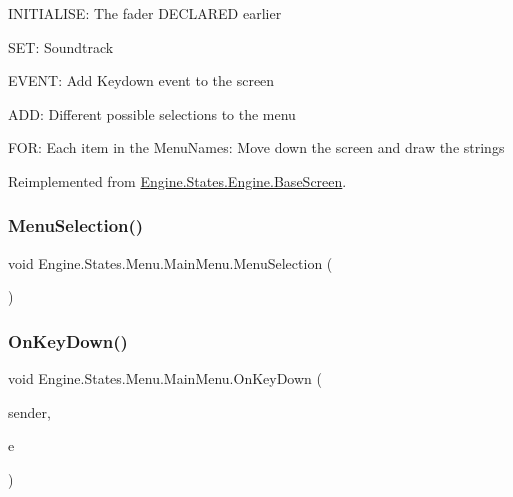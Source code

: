 I\+N\+I\+T\+I\+A\+L\+I\+SE\+: The fader D\+E\+C\+L\+A\+R\+ED earlier

S\+ET\+: Soundtrack

E\+V\+E\+NT\+: Add Keydown event to the screen

A\+DD\+: Different possible selections to the menu

F\+OR\+: Each item in the Menu\+Names\+: Move down the screen and draw the strings 

Reimplemented from \hyperlink{a00550_af8fd6890abf865641e190578ef2e054c}{Engine.\+States.\+Engine.\+Base\+Screen}.

\mbox{\label{a00574_a3f150b2f6278d7267d54b38601534ed1}} 
\subsubsection{\texorpdfstring{Menu\+Selection()}{MenuSelection()}}
{\footnotesize\ttfamily void Engine.\+States.\+Menu.\+Main\+Menu.\+Menu\+Selection (\begin{DoxyParamCaption}{ }\end{DoxyParamCaption})\hspace{0.3cm}{\ttfamily [inline]}}

\mbox{\label{a00574_acb1e589815e4a3897d061d69a17dd7d9}} 
\subsubsection{\texorpdfstring{On\+Key\+Down()}{OnKeyDown()}}
{\footnotesize\ttfamily void Engine.\+States.\+Menu.\+Main\+Menu.\+On\+Key\+Down (\begin{DoxyParamCaption}\item[{object}]{sender,  }\item[{\hyperlink{a00362}{Key\+Event\+Args}}]{e }\end{DoxyParamCaption})\hspace{0.3cm}{\ttfamily [inline]}}

